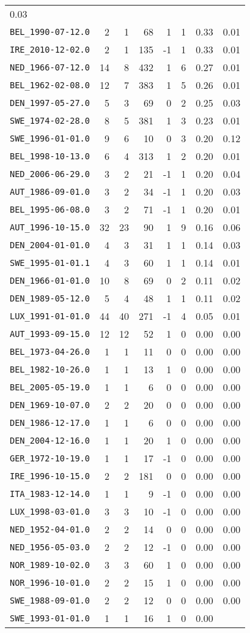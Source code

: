 \documentclass[]{article}
\begin{document}
\begin{longtable}[c]{@{}lrrrrrrr@{}}
0.03\tabularnewline
\texttt{BEL\_1990-07-12.0} & 2 & 1 & 68 & 1 & 1 & 0.33 &
0.01\tabularnewline
\texttt{IRE\_2010-12-02.0} & 2 & 1 & 135 & -1 & 1 & 0.33 &
0.01\tabularnewline
\texttt{NED\_1966-07-12.0} & 14 & 8 & 432 & 1 & 6 & 0.27 &
0.01\tabularnewline
\texttt{BEL\_1962-02-08.0} & 12 & 7 & 383 & 1 & 5 & 0.26 &
0.01\tabularnewline
\texttt{DEN\_1997-05-27.0} & 5 & 3 & 69 & 0 & 2 & 0.25 &
0.03\tabularnewline
\texttt{SWE\_1974-02-28.0} & 8 & 5 & 381 & 1 & 3 & 0.23 &
0.01\tabularnewline
\texttt{SWE\_1996-01-01.0} & 9 & 6 & 10 & 0 & 3 & 0.20 &
0.12\tabularnewline
\texttt{BEL\_1998-10-13.0} & 6 & 4 & 313 & 1 & 2 & 0.20 &
0.01\tabularnewline
\texttt{NED\_2006-06-29.0} & 3 & 2 & 21 & -1 & 1 & 0.20 &
0.04\tabularnewline
\texttt{AUT\_1986-09-01.0} & 3 & 2 & 34 & -1 & 1 & 0.20 &
0.03\tabularnewline
\texttt{BEL\_1995-06-08.0} & 3 & 2 & 71 & -1 & 1 & 0.20 &
0.01\tabularnewline
\texttt{AUT\_1996-10-15.0} & 32 & 23 & 90 & 1 & 9 & 0.16 &
0.06\tabularnewline
\texttt{DEN\_2004-01-01.0} & 4 & 3 & 31 & 1 & 1 & 0.14 &
0.03\tabularnewline
\texttt{SWE\_1995-01-01.1} & 4 & 3 & 60 & 1 & 1 & 0.14 &
0.01\tabularnewline
\texttt{DEN\_1966-01-01.0} & 10 & 8 & 69 & 0 & 2 & 0.11 &
0.02\tabularnewline
\texttt{DEN\_1989-05-12.0} & 5 & 4 & 48 & 1 & 1 & 0.11 &
0.02\tabularnewline
\texttt{LUX\_1991-01-01.0} & 44 & 40 & 271 & -1 & 4 & 0.05 &
0.01\tabularnewline
\texttt{AUT\_1993-09-15.0} & 12 & 12 & 52 & 1 & 0 & 0.00 &
0.00\tabularnewline
\texttt{BEL\_1973-04-26.0} & 1 & 1 & 11 & 0 & 0 & 0.00 &
0.00\tabularnewline
\texttt{BEL\_1982-10-26.0} & 1 & 1 & 13 & 1 & 0 & 0.00 &
0.00\tabularnewline
\texttt{BEL\_2005-05-19.0} & 1 & 1 & 6 & 0 & 0 & 0.00 &
0.00\tabularnewline
\texttt{DEN\_1969-10-07.0} & 2 & 2 & 20 & 0 & 0 & 0.00 &
0.00\tabularnewline
\texttt{DEN\_1986-12-17.0} & 1 & 1 & 6 & 0 & 0 & 0.00 &
0.00\tabularnewline
\texttt{DEN\_2004-12-16.0} & 1 & 1 & 20 & 1 & 0 & 0.00 &
0.00\tabularnewline
\texttt{GER\_1972-10-19.0} & 1 & 1 & 17 & -1 & 0 & 0.00 &
0.00\tabularnewline
\texttt{IRE\_1996-10-15.0} & 2 & 2 & 181 & 0 & 0 & 0.00 &
0.00\tabularnewline
\texttt{ITA\_1983-12-14.0} & 1 & 1 & 9 & -1 & 0 & 0.00 &
0.00\tabularnewline
\texttt{LUX\_1998-03-01.0} & 3 & 3 & 10 & -1 & 0 & 0.00 &
0.00\tabularnewline
\texttt{NED\_1952-04-01.0} & 2 & 2 & 14 & 0 & 0 & 0.00 &
0.00\tabularnewline
\texttt{NED\_1956-05-03.0} & 2 & 2 & 12 & -1 & 0 & 0.00 &
0.00\tabularnewline
\texttt{NOR\_1989-10-02.0} & 3 & 3 & 60 & 1 & 0 & 0.00 &
0.00\tabularnewline
\texttt{NOR\_1996-10-01.0} & 2 & 2 & 15 & 1 & 0 & 0.00 &
0.00\tabularnewline
\texttt{SWE\_1988-09-01.0} & 2 & 2 & 12 & 0 & 0 & 0.00 &
0.00\tabularnewline
\texttt{SWE\_1993-01-01.0} & 1 & 1 & 16 & 1 & 0 & 0.00 &

\end{longtable}
\end{document}
